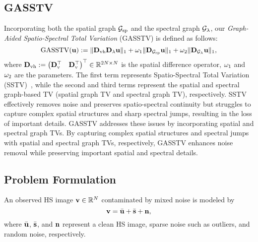 \subsection{GASSTV}
\label{subsec:GASSTV}
Incorporating both the spatial graph $\mathcal{G}_{\text{sp}}$ and the spectral graph $\mathcal{G}_{\lambda}$, our \textit{Graph-Aided Spatio-Spectral Total Variation} (GASSTV) is defined as follows:
\begin{equation}
    \label{eq:GASSTV}
    \text{GASSTV}(\mathbf{u}) := \| \mathbf{D}_{\text{vh}} \mathbf{D}_{\lambda} \mathbf{u}\|_{1} + \omega_{1} \| \mathbf{D}_{\mathcal{G}_{\text{sp}}} \mathbf{u} \|_{1} + \omega_{2} \| \mathbf{D}_{\mathcal{G}_{\lambda}} \mathbf{u} \|_{1},
\end{equation}
where $\mathbf{D}_{\text{vh}} := \begin{pmatrix} \mathbf{D}_{\text{v}}^{\top} & \mathbf{D}_{\text{v}}^{\top} \end{pmatrix}^{\top} \in \mathbb{R}^{2 N \times N}$ is the spatial difference operator, $\omega_{1}$ and $\omega_{2}$ are the parameters.
The first term represents Spatio-Spectral Total Variation (SSTV)~\cite{Aggarwal2016SSTV}, while the second and third terms represent the spatial and spectral graph-based TV (spatial graph TV and spectral graph TV), respectively.
SSTV effectively removes noise and preserves spatio-spectral continuity but struggles to capture complex spatial structures and sharp spectral jumps, resulting in the loss of important details.
GASSTV addresses these issues by incorporating spatial and spectral graph TVs.
By capturing complex spatial structures and spectral jumps with spatial and spectral graph TVs, respectively, GASSTV enhances noise removal while preserving important spatial and spectral details.


\subsection{Problem Formulation}
\label{subsec:ProbForm}
An observed HS image $\mathbf{v} \in \mathbb{R}^{N}$ contaminated by mixed noise is modeled by
\begin{equation}
    \label{eq:ObsvModel}
    \mathbf{v} = \bar{\mathbf{u}} + \bar{\mathbf{s}} + \mathbf{n},
\end{equation}
where $\bar{\mathbf{u}}$, $\bar{\mathbf{s}}$, and $\mathbf{n}$ represent a clean HS image, sparse noise such as outliers, and random noise, respectively.

